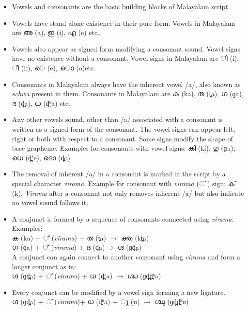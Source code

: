 \documentclass[10pt]{article}
\begin{document}
\begin{itemize}
	\item
	Vowels and consonants are the basic building blocks of Malayalam script.
	\item
	Vowels have stand alone existence in their pure form. Vowels in Malayalam are {\manjari അ} (a), {\manjari ഇ} (i), {\manjari എ} (e) etc.
	\item
	Vowels also appear as signed form modifying a consonant sound. Vowel signs have no existence without a consonant. Vowel signs in Malayalam are {\manjari  ി} (i), {\manjari ീ} (iː), {\manjari െ} (e), {\manjari ൊ } (o)etc.
	\item Consonants in Malayalam always have the inherent vowel /a/, also known as \textit{schwa} present in them. Consonants in Malayalam are {\manjari ക} (ka), {\manjari ത} (t̪a), {\manjari ഗ} (ɡa), {\manjari ദ} (d̪a), {\manjari ധ} (d̪ʱa) etc.
	\item
	Any other vowels sound, other than /a/  associated with a consonant is written as a signed form of the consonant. The vowel signs can  appear left, right or both with respect to a consonant. Some signs modify the shape of base grapheme. Examples for consonants with vowel signs:  {\manjari കി} (ki), {\manjari ഗു} (ɡu), {\manjari ധെ} (d̪ʱe), {\manjari ദൊ} (d̪o) 
	\item 
	The removal of inherent /a/ in a consonant is marked in the script by a special character \textit{virama}. Example for consonant with \textit{virama} ({\manjari ് }) sign: {\manjari ക്} (k). \textit{Virama} after a consonant not only removes inherent /a/ but also indicate no vowel sound follows it. 
	\item
	A conjunct is formed by  a sequence of consonants connected using \textit{virama}. 
	Examples:\\ {\manjari ക} (ka) + {\manjari ് } (\textit{virama}) + {\manjari ത} (t̪a) $\rightarrow$ {\manjari ക്ത} (kt̪a)\\
	 {\manjari ഗ} (ɡa) + {\manjari ് } (\textit{virama}) + {\manjari ദ}  (d̪a)$\rightarrow$ {\manjari ഗ്ദ} (ɡd̪a) \\
	 A conjunct can again connect to another consonant using \textit{virama} and form a longer conjunct as in:\\ {\manjari ഗ്ദ} (ɡd̪a) + {\manjari ്} (\textit{virama})  + {\manjari ധ} (d̪ʱa) $\rightarrow$ {\manjari ഗ്ദ്ധ} (ɡd̪d̪ʱa)
	\item	
	Every conjunct can be modified by a vowel sign forming a new ligature. \\
	{\manjari ഗ്ദ} (ɡd̪a) +   {\manjari ് } (\textit{virama})+ {\manjari ധ} (d̪ʱa) + {\manjari ു} (u) $\rightarrow$ {\manjari ഗ്ദ്ധു} (ɡd̪d̪ʱu)

\end{itemize}
\end{document}
